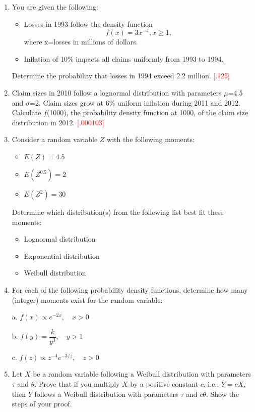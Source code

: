 \documentclass{article}
\begin{document}
\begin{enumerate}
\item
You are given the following:
	\begin{itemize}
	\item Losses in 1993 follow the density function
	\[f(x) = 3x^{-4}, x\ge 1,\]
	where x=losses in millions of dollars.
	\item Inflation of 10\% impacts all claims uniformly from 1993 to 1994.
	\end{itemize}
Determine the probability that losses in 1994 exceed 2.2 million. \textcolor{red}{[.125]}

\item
Claim sizes in 2010 follow a lognormal distribution with parameters $\mu$=4.5 and $\sigma$=2. Claim sizes grow at 6\% uniform inflation during 2011 and 2012.\\Calculate $f$(1000), the probability density function at 1000, of the claim size distribution in 2012. \textcolor{red}{[.000103]}

\item
   Consider a random variable $Z$ with the following moments:
   \begin{itemize}
     \item $E(Z) = 4.5$
     \item $E(Z^{0.5}) = 2$
     \item $E(Z^2) = 30$
   \end{itemize}
   
   Determine which distribution(s) from the following list best fit these moments:
   \begin{itemize}
     \item Lognormal distribution
     \item Exponential distribution
     \item Weibull distribution
   \end{itemize}


\item 
   For each of the following probability density functions, determine how many (integer) moments exist for the random variable:

   a. $f(x) \propto e^{-2x}, \quad x > 0$

   b. $f(y) = \dfrac{k}{y^3}, \quad y > 1$

   c. $f(z) \propto z^{-4} e^{-3/z}, \quad z > 0$

\item 
   Let $X$ be a random variable following a Weibull distribution with parameters $\tau$ and $\theta$. Prove that if you multiply $X$ by a positive constant $c$, i.e., $Y = cX$, then $Y$ follows a Weibull distribution with parameters $\tau$ and $c\theta$. Show the steps of your proof.
\end{enumerate}
\end{document}
